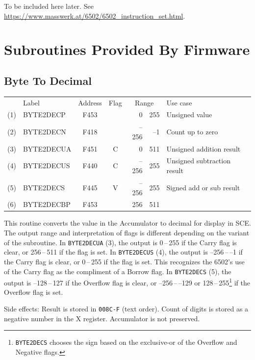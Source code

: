 \documentclass[12pt]{{memoir}}
\begin{document}
To be included here later. See \url{https://www.masswerk.at/6502/6502_instruction_set.html}.

\section{Subroutines Provided By Firmware}

\subsection{Byte To Decimal}

\begin{center}\begin{tabular}{r>{\ttfamily}l>{\ttfamily}ccr@{\,--\,}rl}
& \textrm{Label} & \textrm{Address} & Flag & \multicolumn{2}{c}{\phantom{--}Range} & Use case \\
(1) & BYTE2DECP & F453 & & 0&255 & Unsigned value \\
(2) & BYTE2DECN & F418 & & --256&--1 & Count up to zero \\
(3) & BYTE2DECUA & F451 & C & 0&511 & Unsigned addition result \\
(4) & BYTE2DECUS & F440 & C & --256&255 & Unsigned subtraction result \\
(5) & BYTE2DECS & F445 & V & --256&255 & Signed add or sub result \\
(6) & BYTE2DECBP & F453 & & 256&511 \\
\end{tabular}\end{center}

This routine converts the value in the Accumulator to decimal for display in SCE. The output range and interpretation of flags is different depending on the variant of the subroutine. In \texttt{BYTE2DECUA} (3), the output is 0\,--\,255 if the Carry flag is clear, or 256\,--\,511 if the flag is set. In \texttt{BYTE2DECUS} (4), the output is --256\,--\,--1 if the Carry flag is clear, or 0\,--\,255 if the flag is set. This recognizes the 6502's use of the Carry flag as the compliment of a Borrow flag. In \texttt{BYTE2DECS} (5), the output is --128\,--\,127 if the Overflow flag is clear, or --256\,--\,--129 or 128\,--\,255\footnote{\texttt{BYTE2DECS} chooses the sign based on the exclusive-or of the Overflow and Negative flags.} if the Overflow flag is set.

Side effects: Result is stored in \texttt{008C-F} (text order). Count of digits is stored as a negative number in the X register. Accumulator is not preserved.
\end{document}
